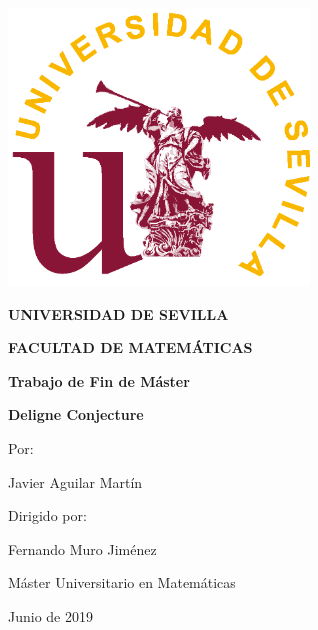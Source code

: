 \documentclass[twoside,11pt]{report}
\begin{document}
\begin{titlepage}
	\centering
		\includegraphics[width=8cm]{Imagenes/sello.png}
		
	{\Large\bfseries UNIVERSIDAD DE SEVILLA\par}
	{\Large\bfseries FACULTAD DE MATEMÁTICAS\par}
	\vspace{0.5cm}
	{\large\bfseries Trabajo de Fin de Máster \par}
	\vspace{1cm}
	{\Huge\bfseries Deligne Conjecture\par}
	\vspace{1cm}
	{\large Por:\par}
	{\large Javier Aguilar Martín\par}
	\vspace{0.5cm}
	{\large Dirigido por:\par}
	{\large Fernando Muro Jiménez\par}
	\vspace{1cm}
	{\large Máster Universitario en Matemáticas\par}
	\vspace{0.5cm}
	{\large  Junio de 2019\par}
	\vspace{1cm}





	
\end{titlepage}



\tableofcontents


\end{document}
